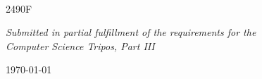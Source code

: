 \begin{titlepage} 

\begin{center}
\noindent
\huge
\dissertationtitle \\
\end{center}

\begin{center}
\noindent
\huge
2490F\\
\end{center}

\vspace{24pt} 

\begin{center}
\noindent
\large
{\it Submitted in partial fulfillment of the requirements for the\\
Computer Science Tripos, Part III} 
\end{center}

\begin{center}
\noindent
\today
\end{center}

\end{titlepage} 

\vspace*{\fill}
